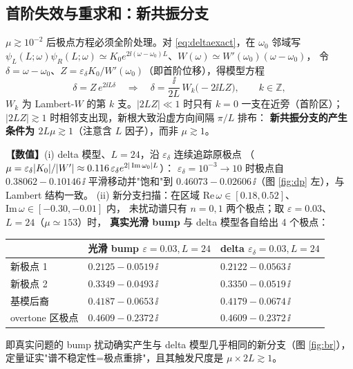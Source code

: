 \subsection{首阶失效与重求和：新共振分支}
\label{sec:resum}

$\mu\gtrsim10^{-2}$ 后极点方程必须全阶处理。对 \eqref{eq:deltaexact}，在 $\omega_0$ 邻域写
$\psi_L(L;\omega)\psi_R(L;\omega)\simeq K_0e^{2\ii(\omega-\omega_0)L}$、$W(\omega)\simeq W'(\omega_0)(\omega-\omega_0)$，
令 $\delta=\omega-\omega_0$、$Z=\varepsilon_\delta K_0/W'(\omega_0)$（即首阶位移），得模型方程
\begin{equation}
\delta=Z\,e^{2\ii L\delta}
\quad\Longrightarrow\quad
\delta=\frac{\ii}{2L}\,W_k\!\big(-2\ii LZ\big),\qquad k\in\mathbb Z ,
\label{eq:lambert}
\end{equation}
$W_k$ 为 Lambert-$W$ 的第 $k$ 支。$|2LZ|\ll1$ 时只有 $k=0$ 一支在近旁（首阶区）；
$|2LZ|\gtrsim1$ 时相邻支出现，新根大致沿虚方向间隔 $\pi/L$ 排布：
\textbf{新共振分支的产生条件为 $2L\mu\gtrsim1$}（注意含 $L$ 因子），而非 $\mu\gtrsim1$。

\textbf{【数值】}(i) delta 模型、$L=24$，沿 $\varepsilon_\delta$ 连续追踪原极点
（$\mu=\varepsilon_\delta|K_0|/|W'|\approx0.116\,\varepsilon_\delta e^{2|\operatorname{Im}\omega_0|L}$）：
$\varepsilon_\delta=10^{-3}\to10$ 时极点自 $0.38062-0.10146\,\ii$ 平滑移动并"饱和"到
$0.46073-0.02606\,\ii$（图 \ref{fig:dp} 左），与 Lambert 结构一致。
(ii) 新分支扫描：在区域 $\mathrm{Re}\,\omega\in[0.18,0.52]$、$\mathrm{Im}\,\omega\in[-0.30,-0.01]$ 内，
未扰动谱只有 $n=0,1$ 两个极点；取 $\varepsilon=0.03$、$L=24$（$\mu\simeq153$）时，
\textbf{真实光滑 bump} 与 delta 模型各自给出 4 个极点：
\begin{center}\small
\begin{tabular}{lll}
\toprule
 & {光滑 bump $\varepsilon=0.03,L=24$}& delta $\varepsilon_\delta=0.03,L=24$\\
\midrule
{新极点 1}& $0.2125-0.0519\,\ii$ & $0.2122-0.0563\,\ii$\\
{新极点 2}& $0.3349-0.0493\,\ii$ & $0.3350-0.0519\,\ii$\\
{基模后裔}& $0.4187-0.0653\,\ii$ & $0.4179-0.0674\,\ii$\\
{overtone 区极点}& $0.4609-0.2372\,\ii$ & $0.4609-0.2372\,\ii$\\
\bottomrule
\end{tabular}
\end{center}
即真实问题的 bump 扰动确实产生与 delta 模型几乎相同的新分支（图 \ref{fig:br}），
定量证实"谱不稳定性=极点重排"，且其触发尺度是 $\mu\times2L\gtrsim1$。

